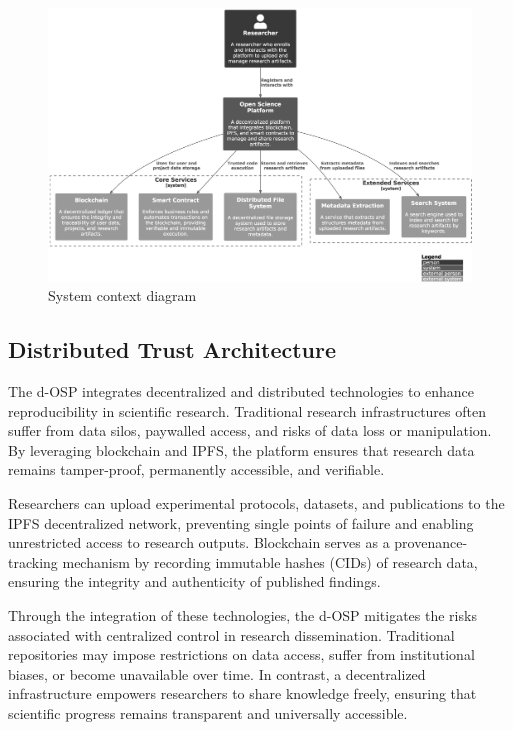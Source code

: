 \documentclass[final]{rc-book-2.14}
\begin{document}
\begin{figure}[htbp]
    \centering
    \includegraphics[scale=0.30]{fig/c4_context_diagram.eps}
    \caption{System context diagram}
    \label{fig:c4_context_diagram}
\end{figure}

\subsection{Distributed Trust Architecture}

The d-OSP integrates decentralized and distributed technologies to enhance reproducibility in scientific research. Traditional research infrastructures often suffer from data silos, paywalled access, and risks of data loss or manipulation. By leveraging blockchain and IPFS, the platform ensures that research data remains tamper-proof, permanently accessible, and verifiable.

Researchers can upload experimental protocols, datasets, and publications to the IPFS decentralized network, preventing single points of failure and enabling unrestricted access to research outputs. Blockchain serves as a provenance-tracking mechanism by recording immutable hashes (CIDs) of research data, ensuring the integrity and authenticity of published findings.

Through the integration of these technologies, the d-OSP mitigates the risks associated with centralized control in research dissemination. Traditional repositories may impose restrictions on data access, suffer from institutional biases, or become unavailable over time. In contrast, a decentralized infrastructure empowers researchers to share knowledge freely, ensuring that scientific progress remains transparent and universally accessible.
\end{document}
